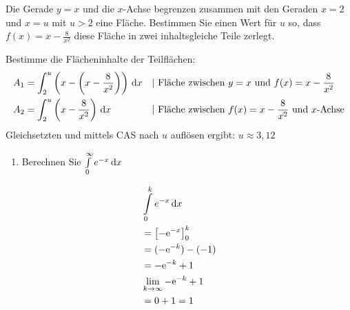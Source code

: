 Die Gerade $y=x$ und die $x$-Achse begrenzen zusammen mit den Geraden $x=2$ und $x=u$ mit $u>2$ eine Fläche. Bestimmen Sie einen Wert für $u$ so, dass $f(x)=x-\frac{8}{x^2}$ diese Fläche in zwei inhaltsgleiche Teile zerlegt. \cas
\begin{lsg}{}
  Bestimme die Flächeninhalte der Teilflächen:\begin{align*}
  A_1&=\int_2^u\left(x-\left(x-\frac{8}{x^2}\right)\right)\d x&&|\ \text{Fläche zwischen $y=x$ und $f(x)=x-\frac{8}{x^2}$}\\
  A_2&= \int_2^u\left(x-\frac{8}{x^2}\right)\d x&&|\ \text{Fläche zwischen $f(x)=x-\frac{8}{x^2}$ und $x$-Achse}
  \end{align*}
  Gleichsetzten und mittels CAS nach $u$ auflösen ergibt: $u\approx 3,12$
\end{lsg}


\begin{enumerate}
	\item Berechnen Sie $\int\limits^\infty_0 e^{-x}\,\mathrm{d} x$
\end{enumerate}
\begin{lsg}{}
	\begin{align*}
		&\int\limits^k_0 e^{-x}\,\mathrm{d} x\\
		&=\left[-\mathrm{e}^{-x}\right]_0^k\\
		&=(-\mathrm{e}^{-k})-(-1)\\
		&=-\mathrm{e}^{-k}+1\\
		&\lim\limits_{k\rightarrow \infty}-\mathrm{e}^{-k}+1\\
		&=0+1=1
	\end{align*}
\end{lsg}


